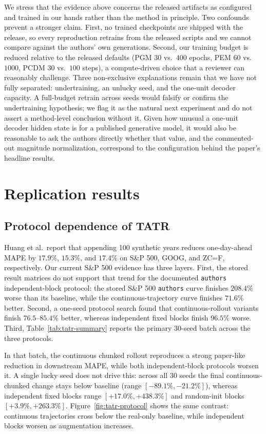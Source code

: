 \documentclass{article}
\begin{document}
We stress that the evidence above concerns the released artifacts as configured and trained in our hands rather than the method in principle. Two confounds prevent a stronger claim. First, no trained checkpoints are shipped with the release, so every reproduction retrains from the released scripts and we cannot compare against the authors' own generations. Second, our training budget is reduced relative to the released defaults (PGM $30$ vs.\ $400$ epochs, PEM $60$ vs.\ $1000$, PCDM $30$ vs.\ $100$ steps), a compute-driven choice that a reviewer can reasonably challenge. Three non-exclusive explanations remain that we have not fully separated: undertraining, an unlucky seed, and the one-unit decoder capacity. A full-budget retrain across seeds would falsify or confirm the undertraining hypothesis; we flag it as the natural next experiment and do not assert a method-level conclusion without it. Given how unusual a one-unit decoder hidden state is for a published generative model, it would also be reasonable to ask the authors directly whether that value, and the commented-out magnitude normalization, correspond to the configuration behind the paper's headline results.

\section{Replication results}
\label{sec:results}

\subsection{Protocol dependence of TATR}

Huang et al.\ report that appending 100 synthetic years reduces one-day-ahead MAPE by $17.9\%$, $15.3\%$, and $17.4\%$ on S\&P 500, GOOG, and ZC=F, respectively. Our current S\&P 500 evidence has three layers. First, the stored result matrices do not support that trend for the documented \texttt{authors} independent-block protocol: the stored S\&P 500 \texttt{authors} curve finishes $208.4\%$ worse than its baseline, while the continuous-trajectory curve finishes $71.6\%$ better. Second, a one-seed protocol search found that continuous-rollout variants finish $76.5$--$85.4\%$ better, whereas independent fixed blocks finish $96.5\%$ worse. Third, Table~\ref{tab:tatr-summary} reports the primary 30-seed batch across the three protocols.

In that batch, the continuous chunked rollout reproduces a strong paper-like reduction in downstream MAPE, while both independent-block protocols worsen it. A single lucky seed does not drive this: across all 30 seeds the final continuous-chunked change stays below baseline (range $[-89.1\%,-21.2\%]$), whereas independent fixed blocks range $[+17.0\%,+438.3\%]$ and random-init blocks $[+3.9\%,+263.3\%]$. Figure~\ref{fig:tatr-protocol} shows the same contrast: continuous trajectories cross below the real-only baseline, while independent blocks worsen as augmentation increases.
\end{document}
